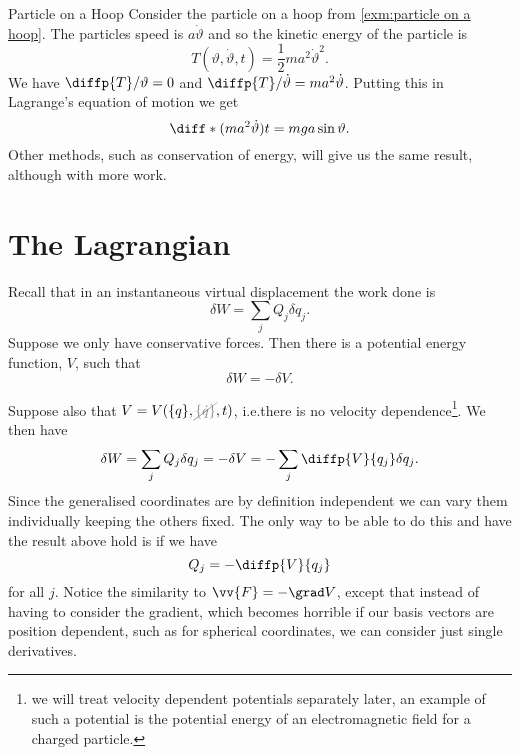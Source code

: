 \documentclass[fleqn]{NotesClass}
\newcommand*{\nodependence}[1]{\textcolor{gray}{\cancel{#1}}}
\begin{document}
    \begin{exm}{Particle on a Hoop}{}
        Consider the particle on a hoop from \cref{exm:particle on a hoop}.
        The particles speed is \(a\dot{\vartheta}\) and so the kinetic energy of the particle is
        \begin{equation}
            T(\vartheta, \dot{\vartheta}, t) = \frac{1}{2}ma^2 \dot{\vartheta}^2.
        \end{equation}
        We have \(\diffp{T}/{\vartheta} = 0\) and \(\diffp{T}/{\dot{\vartheta}} = ma^2\dot{\vartheta}\).
        Putting this in Lagrange's equation of motion we get
        \begin{equation}
            \diff*{(ma^2\dot{\vartheta})}{t} = mga\sin\vartheta.
        \end{equation}
        Other methods, such as conservation of energy, will give us the same result, although with more work.
    \end{exm}
    
    \section{The Lagrangian}\label{sec:the lagrangian}
    Recall that in an instantaneous virtual displacement the work done is
    \begin{equation}
        \delta W = \sum_j Q_j \delta q_j.
    \end{equation}
    Suppose we only have conservative forces.
    Then there is a potential energy function, \(V\), such that
    \begin{equation}
        \delta W = -\delta V.
    \end{equation}
    
    Suppose also that \(V = V(\{q\}, \nodependence{\{\dot{q}\}}, t)\), i.e.\@ there is no velocity dependence\footnote{we will treat velocity dependent potentials separately later, an example of such a potential is the potential energy of an electromagnetic field for a charged particle.}.
    We then have
    \begin{equation}
        \delta W = \sum_j Q_j \delta q_j = -\delta V = -\sum_j \diffp{V}{q_j}\delta q_j.
    \end{equation}
    Since the generalised coordinates are by definition independent we can vary them individually keeping the others fixed.
    The only way to be able to do this and have the result above hold is if we have
    \begin{equation}
        Q_j = -\diffp{V}{q_j}
    \end{equation}
    for all \(j\).
    Notice the similarity to \(\vv{F} = -\grad V\), except that instead of having to consider the gradient, which becomes horrible if our basis vectors are position dependent, such as for spherical coordinates, we can consider just single derivatives.
    
\end{document}
